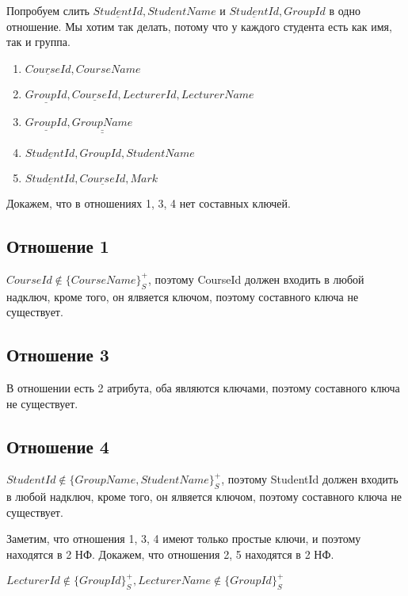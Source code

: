 \documentclass{article}
\begin{document}
	Попробуем слить $\underline{StudentId}, StudentName$ и  $\underline{StudentId}, GroupId$ в одно отношение. Мы хотим так делать, потому что у каждого студента есть как имя, так и группа.
	
	\begin{enumerate}
		\item $\underline{CourseId}, CourseName$
		\item $\underline{GroupId}, \underline{CourseId}, LecturerId, LecturerName$
		\item $\underline{GroupId}, \underline{\underline{GroupName}}$
		\item $\underline{StudentId}, GroupId, StudentName$
		\item $\underline{StudentId}, \underline{CourseId}, Mark$
	\end{enumerate}

	Докажем, что в отношениях 1, 3, 4 нет составных ключей.
	
	\subsection{Отношение 1}
	
	$CourseId \not\in \{CourseName\}_S^+$, поэтому CourseId должен входить в любой надключ, кроме того, он ялвяется ключом, поэтому составного ключа не существует.
	
	\subsection{Отношение 3}
	
	В отношении есть 2 атрибута, оба являются ключами, поэтому составного ключа не существует.
	
	\subsection{Отношение 4}
	
	$StudentId \not\in \{GroupName, StudentName\}_S^+$, поэтому StudentId должен входить в любой надключ, кроме того, он ялвяется ключом, поэтому составного ключа не существует.\newline\newline
	
	
	

	Заметим, что отношения 1, 3, 4 имеют только простые ключи, и поэтому находятся в 2 НФ. Докажем, что отношения 2, 5 находятся в 2  НФ.
	
	$LecturerId \not\in \{GroupId\}_S^+, LecturerName \not\in \{GroupId\}_S^+$
	
\end{document}
